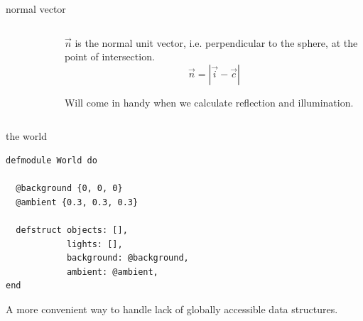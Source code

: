 \begin{frame}[fragile]{normal vector}


\begin{columns}
 \begin{column}{0.4\linewidth}
\begin{figure}
\end{figure}
 \end{column}
\pause
 \begin{column}{0.6\linewidth}
$\vec{n}$ is the normal unit vector, i.e. perpendicular to the sphere, at the point of intersection.
  $$\vec{n} = |\vec{i} - \vec{c}|$$
\pause 

Will come in handy when we calculate reflection and illumination.

 \end{column}
\end{columns}

\end{frame}

\begin{frame}[fragile]{the world}

\begin{verbatim}
defmodule World do

  @background {0, 0, 0}
  @ambient {0.3, 0.3, 0.3}

  defstruct objects: [],
            lights: [],
            background: @background,
            ambient: @ambient,
end
\end{verbatim}

\pause A more convenient way to handle lack of  globally accessible data structures.
 
\end{frame}

